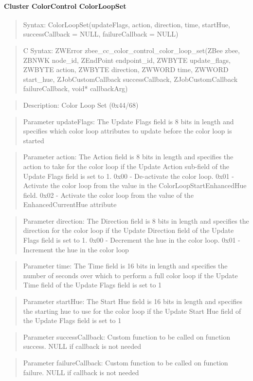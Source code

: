 \paragraph{Cluster ColorControl ColorLoopSet}
\begin{quote}Syntax: ColorLoopSet(updateFlags, action, direction, time, startHue, successCallback = NULL, failureCallback = NULL)\end{quote}
\begin{quote}C Syntax: ZWError zbee\_cc\_color\_control\_color\_loop\_set(ZBee zbee, ZBNWK node\_id, ZEndPoint endpoint\_id, ZWBYTE update\_flags, ZWBYTE action, ZWBYTE direction, ZWWORD time, ZWWORD start\_hue, ZJobCustomCallback successCallback, ZJobCustomCallback failureCallback, void* callbackArg)\end{quote}
\begin{quote}Description: Color Loop Set (0x44/68)\end{quote}
\begin{quote}Parameter updateFlags: The Update Flags field is 8 bits in length and specifies which color loop attributes to update before the color loop is started\end{quote}
\begin{quote}Parameter action: The Action field is 8 bits in length and specifies the action to take for the color loop if the Update Action sub-field of the Update Flags field is set to 1. 0x00 - De-activate the color loop. 0x01 - Activate the color loop from the value in the ColorLoopStartEnhancedHue field. 0x02 - Activate the color loop from the value of the EnhancedCurrentHue attribute\end{quote}
\begin{quote}Parameter direction: The Direction field is 8 bits in length and specifies the direction for the color loop if the Update Direction field of the Update Flags field is set to 1. 0x00 - Decrement the hue in the color loop. 0x01 - Increment the hue in the color loop\end{quote}
\begin{quote}Parameter time: The Time field is 16 bits in length and specifies the number of seconds over which to perform a full color loop if the Update Time field of the Update Flags field is set to 1\end{quote}
\begin{quote}Parameter startHue: The Start Hue field is 16 bits in length and specifies the starting hue to use for the color loop if the Update Start Hue field of the Update Flags field is set to 1\end{quote}
\begin{quote}Parameter successCallback: Custom function to be called on function success. NULL if callback is not needed\end{quote}
\begin{quote}Parameter failureCallback: Custom function to be called on function failure. NULL if callback is not needed\end{quote}


